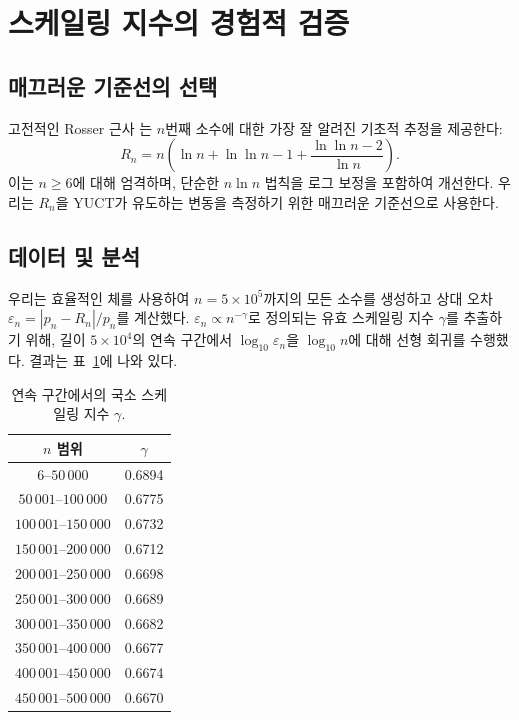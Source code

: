 \documentclass[11pt,a4paper]{article}
\begin{document}
	\section{스케일링 지수의 경험적 검증}
	\subsection{매끄러운 기준선의 선택}
	고전적인 Rosser 근사 \cite{Rosser1941}는 \(n\)번째 소수에 대한 가장 잘 알려진 기초적 추정을 제공한다:
	\begin{equation}\label{eq:rosser}
		R_n = n\!\left(\ln n + \ln\ln n - 1 + \frac{\ln\ln n - 2}{\ln n}\right).
	\end{equation}
	이는 \(n \ge 6\)에 대해 엄격하며, 단순한 \(n\ln n\) 법칙을 로그 보정을 포함하여 개선한다. 우리는 \(R_n\)을 YUCT가 유도하는 변동을 측정하기 위한 매끄러운 기준선으로 사용한다.
	
	\subsection{데이터 및 분석}
	우리는 효율적인 체를 사용하여 \(n = 5\times10^5\)까지의 모든 소수를 생성하고 상대 오차 \(\varepsilon_n = |p_n - R_n|/p_n\)를 계산했다. \(\varepsilon_n \propto n^{-\gamma}\)로 정의되는 유효 스케일링 지수 \(\gamma\)를 추출하기 위해, 길이 \(5\times10^4\)의 연속 구간에서 \(\log_{10}\varepsilon_n\)을 \(\log_{10}n\)에 대해 선형 회귀를 수행했다. 결과는 표~\ref{tab:gamma}에 나와 있다.
	
	\begin{table}[htbp]
		\centering
		\caption{연속 구간에서의 국소 스케일링 지수 \(\gamma\).}
		\label{tab:gamma}
		\small
		\begin{tabular}{c c}
			\toprule
			\(n\) 범위 & \(\gamma\) \\
			\midrule
			\(6\)--\(50\,000\)    & 0.6894 \\
			\(50\,001\)--\(100\,000\) & 0.6775 \\
			\(100\,001\)--\(150\,000\)& 0.6732 \\
			\(150\,001\)--\(200\,000\)& 0.6712 \\
			\(200\,001\)--\(250\,000\)& 0.6698 \\
			\(250\,001\)--\(300\,000\)& 0.6689 \\
			\(300\,001\)--\(350\,000\)& 0.6682 \\
			\(350\,001\)--\(400\,000\)& 0.6677 \\
			\(400\,001\)--\(450\,000\)& 0.6674 \\
			\(450\,001\)--\(500\,000\)& 0.6670 \\
			\bottomrule
		\end{tabular}
	\end{table}
	
\end{document}
